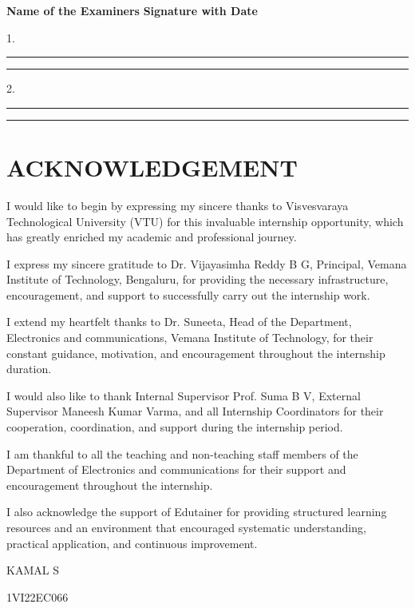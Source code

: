 \documentclass[12pt,a4paper]{report}
\begin{document}
\vspace{0.8cm}
\textbf{Name of the Examiners} \hfill \textbf{Signature with Date}\par
\vspace{0.3cm}
1.\enspace\rule{5cm}{0.4pt} \hfill \rule{3.5cm}{0.4pt}\par
\vspace{0.5cm}
2.\enspace\rule{5cm}{0.4pt} \hfill \rule{3.5cm}{0.4pt}\par



\newpage
\chapter*{ACKNOWLEDGEMENT}

I would like to begin by expressing my sincere thanks to Visvesvaraya Technological University (VTU) for this invaluable internship opportunity, which has greatly enriched my academic and professional journey.

I express my sincere gratitude to Dr. Vijayasimha Reddy B G, Principal, Vemana Institute of Technology, Bengaluru, for providing the necessary infrastructure, encouragement, and support to successfully carry out the internship work.

I extend my heartfelt thanks to Dr. Suneeta, Head of the Department, Electronics and communications, Vemana Institute of Technology, for their constant guidance, motivation, and encouragement throughout the internship duration.

I would also like to thank Internal Supervisor Prof. Suma B V, External Supervisor Maneesh Kumar Varma, and all Internship Coordinators for their cooperation, coordination, and support during the internship period.

I am thankful to all the teaching and non-teaching staff members of the Department of Electronics and communications for their support and encouragement throughout the internship.

I also acknowledge the support of Edutainer for providing structured learning resources and an environment that encouraged systematic understanding, practical application, and continuous improvement.

\vspace{0.5cm}
KAMAL S\par
1VI22EC066\par
\end{document}
